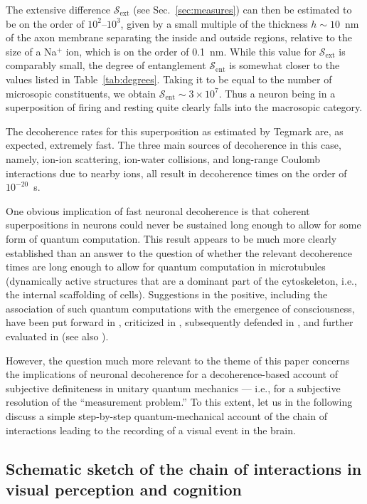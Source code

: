 \documentclass[twocolumn,aps,floatfix,amsmath,amssymb,showpacs,nofootinbib]{revtex4}
\begin{document}
The extensive difference $\mathcal{S}_\text{ext}$ (see
Sec.~\ref{sec:measures}) can then be estimated to be on the order of
$10^2$--$10^3$, given by a small multiple of the thickness $h \sim
10$~nm of the axon membrane separating the inside and outside regions,
relative to the size of a Na$^+$ ion, which is on the order of 0.1~nm.
While this value for $\mathcal{S}_\text{ext}$ is comparably small, the
degree of entanglement $\mathcal{S}_\text{ent}$ is somewhat closer to
the values listed in Table~\ref{tab:degrees}.  Taking it to be equal
to the number of microsopic constituents, we obtain
$\mathcal{S}_\text{ent} \sim 3 \times 10^7$. Thus a neuron being in a
superposition of firing and resting quite clearly falls into the
macrosopic category.

The decoherence rates for this superposition as estimated by Tegmark
are, as expected, extremely fast. The three main sources of
decoherence in this case, namely, ion-ion scattering, ion-water
collisions, and long-range Coulomb interactions due to nearby ions,
all result in decoherence times on the order of $10^{-20}$~s. 

One obvious implication of fast neuronal decoherence is that coherent
superpositions in neurons could never be sustained long enough to
allow for some form of quantum computation. This result appears to be
much more clearly established than an answer to the question of
whether the relevant decoherence times are long enough to allow for
quantum computation in microtubules (dynamically active structures
that are a dominant part of the cytoskeleton, i.e., the internal
scaffolding of cells). Suggestions in the positive, including the
association of such quantum computations with the emergence of
consciousness, have been put forward in
\cite{Penrose:1994:mm,Hameroff:1996:im,Hameroff:1996:iy},
criticized in \cite{Tegmark:2000:wz}, subsequently defended in
\cite{Hagan:2002:th}, and further evaluated in
\cite{Rosa:2004:um} (see also \cite{Stapp:2000:yy}).

However, the question much more relevant to the theme of this paper
concerns the implications of neuronal decoherence for a
decoherence-based account of subjective definiteness in unitary
quantum mechanics --- i.e., for a subjective resolution of the
``measurement problem.'' To this extent,  let us in the following
discuss a simple step-by-step quantum-mechanical account of the chain
of interactions leading to the recording of a visual event in the brain.

\subsection{Schematic sketch of the chain of interactions in visual perception
  and cognition} \label{sec:chain}
\end{document}
